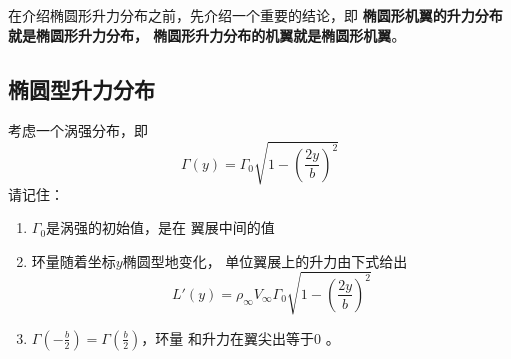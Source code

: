 在介绍椭圆形升力分布之前，先介绍一个重要的结论，即
{\bfseries 椭圆形机翼的升力分布就是椭圆形升力分布，
椭圆形升力分布的机翼就是椭圆形机翼}。
\subsection{椭圆型升力分布}
考虑一个涡强分布，即
\[
  \Gamma(y)=\Gamma_0
  \sqrt{1-\left(\frac{2y}{b}\right)^2} 
\]
请记住：
\begin{enumerate}
  \item $\Gamma_0$是涡强的初始值，是在
    翼展中间的值
  \item 环量随着坐标$y $椭圆型地变化，
    单位翼展上的升力由下式给出
    \[
      L'(y)=\rho_\infty V_\infty 
      \Gamma_0
      \sqrt{1-\left(\frac{2y}{b }\right)^2} 
    \] 
    \item $\Gamma\left(-\frac{b}{2}\right)= 
      \Gamma\left(\frac{b}{2}\right) $，环量
      和升力在翼尖出等于0 。
\end{enumerate}


